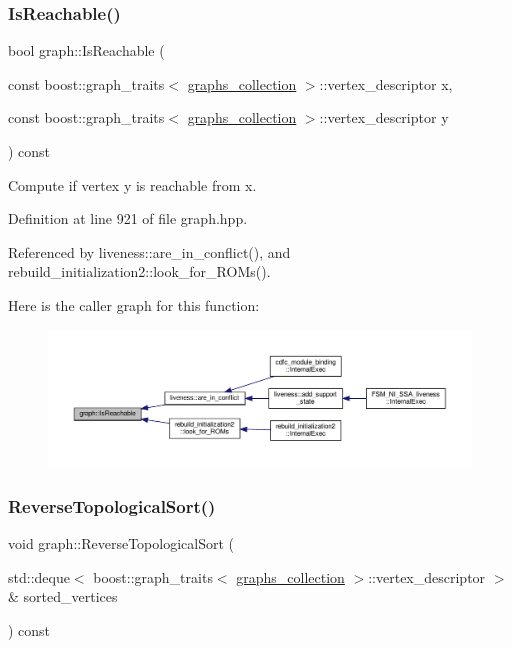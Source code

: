 \subsubsection{\texorpdfstring{Is\+Reachable()}{IsReachable()}}
{\footnotesize\ttfamily bool graph\+::\+Is\+Reachable (\begin{DoxyParamCaption}\item[{const boost\+::graph\+\_\+traits$<$ \hyperlink{structgraphs__collection}{graphs\+\_\+collection} $>$\+::vertex\+\_\+descriptor}]{x,  }\item[{const boost\+::graph\+\_\+traits$<$ \hyperlink{structgraphs__collection}{graphs\+\_\+collection} $>$\+::vertex\+\_\+descriptor}]{y }\end{DoxyParamCaption}) const\hspace{0.3cm}{\ttfamily [inline]}}



Compute if vertex y is reachable from x. 



Definition at line 921 of file graph.\+hpp.



Referenced by liveness\+::are\+\_\+in\+\_\+conflict(), and rebuild\+\_\+initialization2\+::look\+\_\+for\+\_\+\+R\+O\+Ms().

Here is the caller graph for this function\+:
\nopagebreak
\begin{figure}[H]
\begin{center}
\leavevmode
\includegraphics[width=350pt]{d5/d15/structgraph_af941c4f03fca3b040e1bd5f370384360_icgraph}
\end{center}
\end{figure}
\mbox{\label{structgraph_a448f3129d511e7a13643d3a06ffe2e64}} 
\subsubsection{\texorpdfstring{Reverse\+Topological\+Sort()}{ReverseTopologicalSort()}}
{\footnotesize\ttfamily void graph\+::\+Reverse\+Topological\+Sort (\begin{DoxyParamCaption}\item[{std\+::deque$<$ boost\+::graph\+\_\+traits$<$ \hyperlink{structgraphs__collection}{graphs\+\_\+collection} $>$\+::vertex\+\_\+descriptor $>$ \&}]{sorted\+\_\+vertices }\end{DoxyParamCaption}) const\hspace{0.3cm}{\ttfamily [inline]}}




